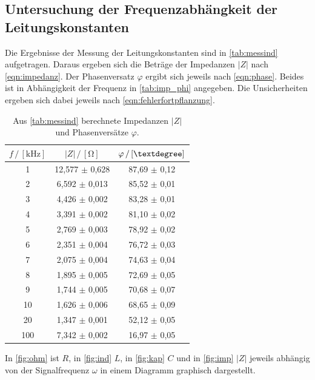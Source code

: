 \subsection{Untersuchung der Frequenzabhängkeit der Leitungskonstanten}
\label{subsec:leitkon}
Die Ergebnisse der Messung der Leitungskonstanten sind in \autoref{tab:messind} aufgetragen. 
Daraus ergeben sich die Beträge der Impedanzen $\left|Z\right|$ nach \autoref{eqn:impedanz}.
Der Phasenversatz $\varphi$ ergibt sich jeweils nach \autoref{eqn:phase}.
Beides ist in Abhängigkeit der Frequenz in \autoref{tab:imp_phi} angegeben.
Die Unsicherheiten ergeben sich dabei jeweils nach \autoref{eqn:fehlerfortpflanzung}.
\begin{table}[H]

    \centering
    \caption{Aus \autoref{tab:messind} berechnete Impedanzen $\left|Z\right|$ und Phasenversätze $\varphi$.}
    \begin{tabular}{ccc}
    \toprule
    $f \,/\, [\unit{\kilo\hertz}]$& $\left|Z\right| \,/\, [\unit{\ohm}]$ & $\varphi \,/\, [\textdegree]$ \\
    \midrule
    1 & 12,577 $\pm$ 0,628 & 87,69 $\pm$ 0,12 \\
    2  & 6,592 $\pm$ 0,013 & 85,52 $\pm$ 0,01 \\
    3  & 4,426 $\pm$ 0,002 & 83,28 $\pm$ 0,01 \\
    4  & 3,391 $\pm$ 0,002 & 81,10 $\pm$ 0,02 \\
    5  & 2,769 $\pm$ 0,003 & 78,92 $\pm$ 0,02 \\
    6  & 2,351 $\pm$ 0,004 & 76,72 $\pm$ 0,03 \\
    7  & 2,075 $\pm$ 0,004 & 74,63 $\pm$ 0,04 \\
    8  & 1,895 $\pm$ 0,005 & 72,69 $\pm$ 0,05 \\
    9  & 1,744 $\pm$ 0,005 & 70,68 $\pm$ 0,07 \\
    10 & 1,626 $\pm$ 0,006 & 68,65 $\pm$ 0,09 \\
    20 & 1,347 $\pm$ 0,001 & 52,12 $\pm$ 0,05 \\
    100 &7,342 $\pm$ 0,002 & 16,97 $\pm$ 0,05 \\
    \bottomrule
    \end{tabular}
    \label{tab:imp_phi}
\end{table}
In \autoref{fig:ohm} ist $R$, in \autoref{fig:ind} $L$, in \autoref{fig:kap} $C$ und in \autoref{fig:imp} $\left|Z\right|$ jeweils abhängig von der Signalfrequenz $\omega$ in einem Diagramm graphisch dargestellt.

